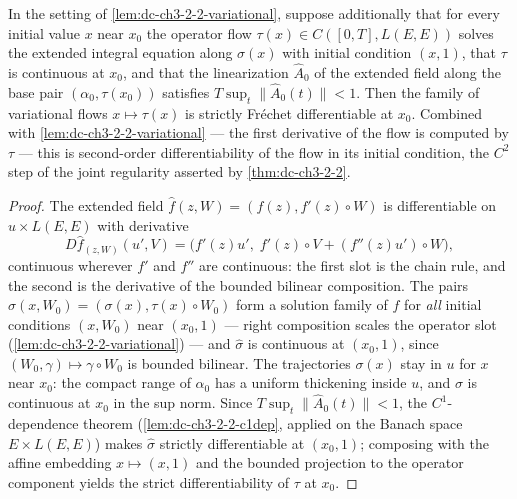 \begin{lemma}
  \label{lem:dc-ch3-2-2-c2dep}


  In the setting of \cref{lem:dc-ch3-2-2-variational}, suppose additionally
  that for every initial value $x$ near $x_0$ the operator flow
  $\tau(x) \in C([0,T], L(E,E))$ solves the extended integral equation along
  $\sigma(x)$ with initial condition $(x, 1)$, that $\tau$ is continuous at
  $x_0$, and that the linearization $\hat A_0$ of the extended field along the
  base pair $(\alpha_0, \tau(x_0))$ satisfies $T \sup_t \|\hat A_0(t)\| < 1$.
  Then the family of variational flows $x \mapsto \tau(x)$ is strictly
  Fr\'echet differentiable at $x_0$. Combined with
  \cref{lem:dc-ch3-2-2-variational} — the first derivative of the flow is
  computed by $\tau$ — this is second-order differentiability of the flow in
  its initial condition, the $C^2$ step of the joint regularity asserted by
  \cref{thm:dc-ch3-2-2}.
\end{lemma}
\begin{proof}
  \sketch

  The extended field $\hat f(z, W) = (f(z), f'(z) \circ W)$ is differentiable
  on $u \times L(E,E)$ with derivative
  $$D\hat f_{(z,W)}(u', V) = \big(f'(z)u',\; f'(z) \circ V
    + (f''(z)u') \circ W\big),$$
  continuous wherever $f'$ and $f''$ are continuous: the first slot is the
  chain rule, and the second is the derivative of the bounded bilinear
  composition. The pairs $\hat\sigma(x, W_0) = (\sigma(x), \tau(x) \circ W_0)$
  form a solution family of $\hat f$ for \emph{all} initial conditions
  $(x, W_0)$ near $(x_0, 1)$ — right composition scales the operator slot
  (\cref{lem:dc-ch3-2-2-variational}) — and $\hat\sigma$ is continuous at
  $(x_0, 1)$, since $(W_0, \gamma) \mapsto \gamma \circ W_0$ is bounded
  bilinear. The trajectories $\sigma(x)$ stay in $u$ for $x$ near $x_0$: the
  compact range of $\alpha_0$ has a uniform thickening inside $u$, and
  $\sigma$ is continuous at $x_0$ in the sup norm. Since
  $T \sup_t \|\hat A_0(t)\| < 1$, the $C^1$-dependence theorem
  (\cref{lem:dc-ch3-2-2-c1dep}, applied on the Banach space
  $E \times L(E,E)$) makes $\hat\sigma$ strictly differentiable at $(x_0, 1)$;
  composing with the affine embedding $x \mapsto (x, 1)$ and the bounded
  projection to the operator component yields the strict differentiability of
  $\tau$ at $x_0$.
\end{proof}

